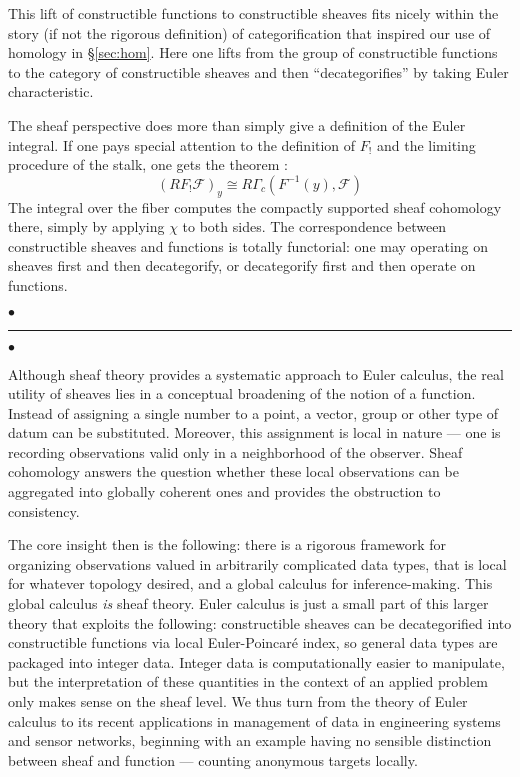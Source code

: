 \documentclass{psapm-l}
\theoremstyle{definition}
\theoremstyle{remark}
\numberwithin{equation}{section}
\begin{document}
This lift of constructible functions to constructible sheaves fits nicely within the story (if not the rigorous definition) of categorification that inspired our use of homology in \S\ref{sec:hom}. Here one lifts from the group of constructible functions to the category of constructible sheaves and then ``decategorifies'' by taking Euler characteristic.

The sheaf perspective does more than simply give a definition of the Euler integral. If one pays special attention to the definition of $F_!$ and the limiting procedure of the stalk, one gets the {{}} theorem \cite{Schurmann}:
\[
    (RF_!{{\mathcal F}})_y \cong R\Gamma_c(F^{-1}(y),{{\mathcal F}})
\]
The integral over the fiber computes the compactly supported sheaf cohomology there, simply by applying $\chi$ to both sides. The correspondence between constructible sheaves and functions is totally functorial: one may operating on sheaves first and then decategorify, or decategorify first and then operate on functions.

{
\begin{center}
\nointerlineskip\vspace{-0.04in}
        $\bullet$\hfill\rule{0.77\linewidth}{1.0pt}\hfill$\bullet$
\par\nointerlineskip\vspace{-0.01in}
\end{center}
}
\vspace{0.1in}

Although sheaf theory provides a systematic approach to Euler calculus, the real utility of sheaves lies in a conceptual broadening of the notion of a function. Instead of assigning a single number to a point, a vector, group or other type of datum can be substituted. Moreover, this assignment is local in nature --- one is recording observations valid only in a neighborhood of the observer. Sheaf cohomology answers the question whether these local observations can be aggregated into globally coherent ones and provides the obstruction to consistency.

The core insight then is the following: there is a rigorous framework for organizing observations valued in arbitrarily complicated data types, that is local for whatever topology desired, and a global calculus for inference-making. This global calculus {\it is} sheaf theory. Euler calculus is just a small part of this larger theory that exploits the following: constructible sheaves can be decategorified into constructible functions via local Euler-Poincar\'e index, so general data types are packaged into integer data. Integer data is computationally easier to manipulate, but the interpretation of these quantities in the context of an applied problem only makes sense on the sheaf level. We thus turn from the theory of Euler calculus to its recent applications in management of data in engineering systems and sensor networks, beginning with an example having no sensible distinction between sheaf and function --- counting anonymous targets locally. 
\end{document}
